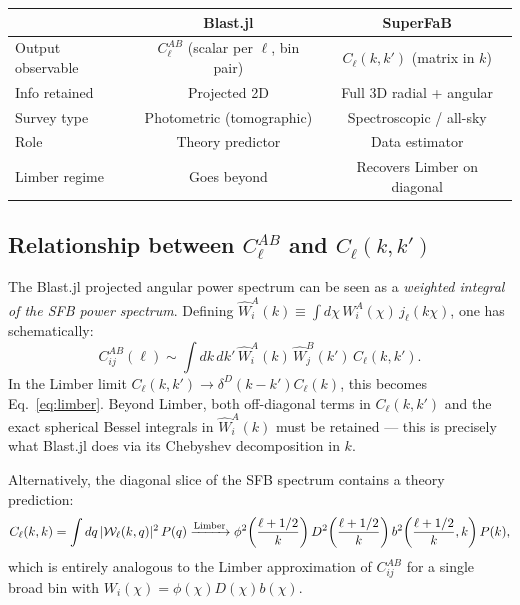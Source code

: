 \begin{center}
\renewcommand{\arraystretch}{1.5}
\begin{tabular}{lcc}
\toprule
& \textbf{Blast.jl} & \textbf{SuperFaB} \\
\midrule
Output observable & $C_\ell^{AB}$ (scalar per $\ell$, bin pair) &
    $C_\ell(k,k')$ (matrix in $k$) \\
Info retained & Projected 2D & Full 3D radial + angular \\
Survey type & Photometric (tomographic) & Spectroscopic / all-sky \\
Role & Theory predictor & Data estimator \\
Limber regime & Goes beyond & Recovers Limber on diagonal \\
\bottomrule
\end{tabular}
\end{center}

\subsection{Relationship between $C_\ell^{AB}$ and $C_\ell(k,k')$}

The Blast.jl projected angular power spectrum can be seen as a
\emph{weighted integral of the SFB power spectrum}. Defining
$\hat{W}_i^A(k) \equiv \int d\chi\,W_i^A(\chi)\,j_\ell(k\chi)$,
one has schematically:
\begin{equation}
    C_{ij}^{AB}(\ell) \sim
    \int dk\, dk'\,
    \hat{W}_i^A(k)\,\hat{W}_j^B(k')\,
    C_\ell(k, k').
    \label{eq:connection}
\end{equation}
In the Limber limit $C_\ell(k,k')\to\delta^D(k-k')C_\ell(k)$, this
becomes Eq.~\eqref{eq:limber}. Beyond Limber, both off-diagonal terms
in $C_\ell(k,k')$ and the exact spherical Bessel integrals in
$\hat{W}_i^A(k)$ must be retained --- this is precisely what
Blast.jl does via its Chebyshev decomposition in $k$.

Alternatively, the diagonal slice of the SFB spectrum contains a
theory prediction:
\begin{equation}
    C_\ell(k,k) =
    \int dq\,|\mathcal{W}_\ell(k,q)|^2\,P(q)
    \xrightarrow{\rm Limber}
    \phi^2\!\left(\frac{\ell+1/2}{k}\right)
    D^2\!\left(\frac{\ell+1/2}{k}\right)
    b^2\!\left(\frac{\ell+1/2}{k},k\right)
    P(k),
\end{equation}
which is entirely analogous to the Limber approximation of $C_{ij}^{AB}$
for a single broad bin with $W_i(\chi)=\phi(\chi)D(\chi)b(\chi)$.

